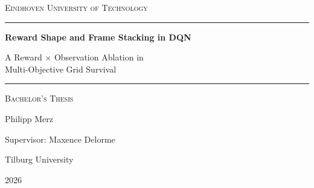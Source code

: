 \documentclass[12pt,a4paper,titlepage]{article}
\begin{document}
\begin{titlepage}
\centering
{}

{\large\scshape Eindhoven University of Technology\par}


\noindent\rule{\textwidth}{0.4pt}
\vspace{0.7\baselineskip}

{\LARGE\bfseries Reward Shape and Frame Stacking in DQN\par}

\vspace{0.6\baselineskip}

{\Large A Reward $\times$ Observation Ablation in\\[0.3\baselineskip]
Multi-Objective Grid Survival\par}

\vspace{0.7\baselineskip}

\noindent\rule{\textwidth}{0.4pt}

\vspace{1.2\baselineskip}

{\large\scshape Bachelor's Thesis\par}


{\Large Philipp Merz\par}

\vspace{1.5\baselineskip}

{\large Supervisor: Maxence Delorme\par}

{\normalsize Tilburg University\par}


{\large 2026\par}

\end{titlepage}
\end{document}
